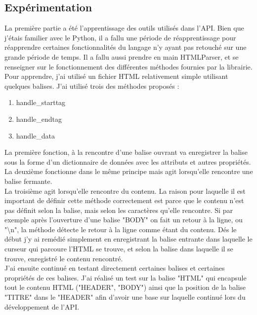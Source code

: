 \subsection{Expérimentation}

La première partie a été l'apprentissage des outils utilisés dans l'API. Bien que j'étais familier avec le Python, il a fallu une période de réapprentissage pour réapprendre certaines fonctionnalités du langage n'y ayant pas retouché sur une grande période de temps. Il a fallu aussi prendre en main HTMLParser, et se renseigner sur le fonctionnement des différentes méthodes fournies par la librairie.\\

Pour apprendre, j'ai utilisé un fichier HTML relativement simple utilisant quelques balises. J'ai utilisé trois des méthodes proposés :\\

\begin{enumerate}
\item handle\_starttag
\item handle\_endtag
\item handle\_data
\end{enumerate}

La première fonction, à la rencontre d'une balise ouvrant va enregistrer la balise sous la forme d'un dictionnaire de données avec les attributs et autres propriétés. La deuxième fonctionne dans le même principe mais agit lorsqu'elle rencontre une balise fermante.\\

La troisième agit lorsqu'elle rencontre du contenu. La raison pour laquelle il est important de définir cette méthode correctement est parce que le contenu n'est pas définit selon la balise, mais selon les caractères qu'elle rencontre. Si par exemple après l'ouverture d'une balise "BODY" on fait un retour à la ligne, ou "\textbackslash n", la méthode détecte le retour à la ligne comme étant du contenu. Dés le début j'y ai remédié simplement en enregistrant la balise entrante dans laquelle le curseur qui parcoure l'HTML se trouve, et selon la balise dans laquelle il se trouve, enregistré le contenu rencontré.\\

J'ai ensuite continué en testant directement certaines balises et certaines propriétés de ces balises. J'ai réalisé un test sur la balise "HTML" qui encapsule tout le contenu HTML ("HEADER", "BODY") ainsi que la position de la balise "TITRE" dans le "HEADER" afin d'avoir une base sur laquelle continué lors du développement de l'API.\\

